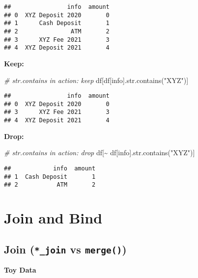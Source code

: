 \documentclass[
]{book}
\newenvironment{Shaded}{\begin{snugshade}}{\end{snugshade}}
\newcommand{\BuiltInTok}[1]{#1}
\newcommand{\CommentTok}[1]{\textcolor[rgb]{0.56,0.35,0.01}{\textit{#1}}}
\newcommand{\NormalTok}[1]{#1}
\newcommand{\OperatorTok}[1]{\textcolor[rgb]{0.81,0.36,0.00}{\textbf{#1}}}
\newcommand{\StringTok}[1]{\textcolor[rgb]{0.31,0.60,0.02}{#1}}
\begin{document}
\begin{verbatim}
##                info  amount
## 0  XYZ Deposit 2020       0
## 1      Cash Deposit       1
## 2               ATM       2
## 3      XYZ Fee 2021       3
## 4  XYZ Deposit 2021       4
\end{verbatim}

\textbf{Keep:}

\begin{Shaded}
\begin{Highlighting}[]
\CommentTok{\# str.contains in action: keep}
\NormalTok{df[df[}\StringTok{\textquotesingle{}info\textquotesingle{}}\NormalTok{].}\BuiltInTok{str}\NormalTok{.contains(}\StringTok{"XYZ"}\NormalTok{)]}
\end{Highlighting}
\end{Shaded}

\begin{verbatim}
##                info  amount
## 0  XYZ Deposit 2020       0
## 3      XYZ Fee 2021       3
## 4  XYZ Deposit 2021       4
\end{verbatim}

\textbf{Drop:}

\begin{Shaded}
\begin{Highlighting}[]
\CommentTok{\# str.contains in action: drop}
\NormalTok{df[}\OperatorTok{\textasciitilde{}}\NormalTok{ df[}\StringTok{\textquotesingle{}info\textquotesingle{}}\NormalTok{].}\BuiltInTok{str}\NormalTok{.contains(}\StringTok{"XYZ"}\NormalTok{)]}
\end{Highlighting}
\end{Shaded}

\begin{verbatim}
##            info  amount
## 1  Cash Deposit       1
## 2           ATM       2
\end{verbatim}

\hypertarget{join-and-bind}{%
\chapter{Join and Bind}\label{join-and-bind}}

\hypertarget{join-_join-vs-merge}{%
\section{\texorpdfstring{Join (\texttt{*\_join} vs \texttt{merge()})}{Join (*\_join vs merge())}}\label{join-_join-vs-merge}}

\textbf{Toy Data}
\end{document}
